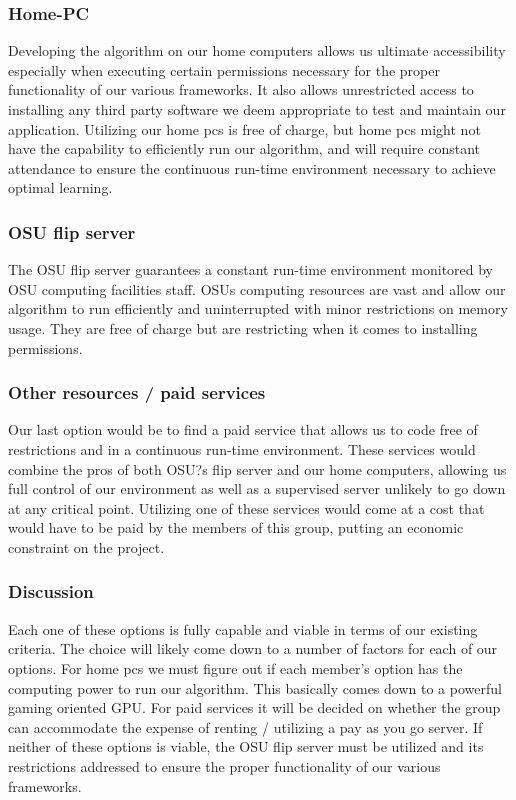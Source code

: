 \documentclass[article, onecolumn, draftclsnofoot,10pt, compsoc]{IEEEtran}
\begin{document}
\subsubsection{Home-PC}
Developing the algorithm on our home computers allows us ultimate accessibility especially when executing certain permissions necessary for the proper functionality of our various frameworks. It also allows unrestricted access to installing any third party software we deem appropriate to test and maintain our application. Utilizing our home pcs is free of charge, but home pcs might not have the capability to efficiently run our algorithm, and will require constant attendance to ensure the continuous run-time environment necessary to achieve optimal learning. 

\subsubsection{OSU flip server}
The OSU flip server guarantees a constant run-time environment monitored by OSU computing facilities staff. OSUs computing resources are vast and allow our algorithm to run efficiently and uninterrupted with minor restrictions on memory usage. They are free of charge but are restricting when it comes to installing permissions. 

\subsubsection{Other resources / paid services}
Our last option would be to find a paid service that allows us to code free of restrictions and in a continuous run-time environment. These services would combine the pros of both OSU?s flip server and our home computers, allowing us full control of our environment as well as a supervised server unlikely to go down at any critical point. Utilizing one of these services would come at a cost that would have to be paid by the members of this group, putting an economic constraint on the project. 

\subsubsection{Discussion}
Each one of these options is fully capable and viable in terms of our existing criteria. The choice will likely come down to a number of factors for each of our options. For home pcs we must figure out if each member's option has the computing power to run our algorithm. This basically comes down to a powerful gaming oriented GPU. For paid services it will be decided on whether the group can accommodate the expense of renting / utilizing a pay as you go server. If neither of these options is viable, the OSU flip server must be utilized and its restrictions addressed to ensure the proper functionality of our various frameworks. 
\end{document}
